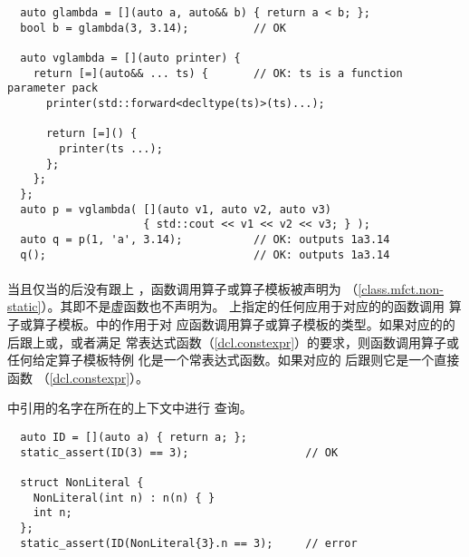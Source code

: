 \begin{example}
  \begin{lstlisting}
  auto glambda = [](auto a, auto&& b) { return a < b; };
  bool b = glambda(3, 3.14);          // OK

  auto vglambda = [](auto printer) {
    return [=](auto&& ... ts) {       // OK: ts is a function parameter pack
      printer(std::forward<decltype(ts)>(ts)...);

      return [=]() {
        printer(ts ...);
      };
    };
  };
  auto p = vglambda( [](auto v1, auto v2, auto v3)
                     { std::cout << v1 << v2 << v3; } );
  auto q = p(1, 'a', 3.14);           // OK: outputs 1a3.14
  q();                                // OK: outputs 1a3.14
  \end{lstlisting}
\end{example}

\paragraph{} %
当且仅当的后没有跟上
，函数调用算子或算子模板被声明为
（\ref{class.mfct.non-static}）。其即不是虚函数也不声明为。
上指定的任何应用于对应的的函数调用
算子或算子模板。中的作用于对
应函数调用算子或算子模板的类型。如果对应的的
后跟上或，或者满足
常表达式函数（\ref{dcl.constexpr}）的要求，则函数调用算子或任何给定算子模板特例
化是一个常表达式函数。如果对应的
后跟则它是一个直接函数
（\ref{dcl.constexpr}）。

\begin{note}
  中引用的名字在所在的上下文中进行
  查询。
\end{note}

\begin{example}
  \begin{lstlisting}
  auto ID = [](auto a) { return a; };
  static_assert(ID(3) == 3);                  // OK

  struct NonLiteral {
    NonLiteral(int n) : n(n) { }
    int n;
  };
  static_assert(ID(NonLiteral{3}.n == 3);     // error
  \end{lstlisting}
\end{example}

